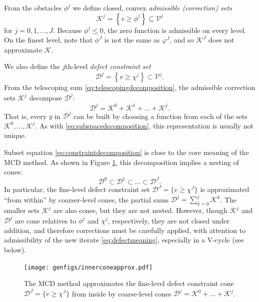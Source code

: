\documentclass[letterpaper,final,12pt,reqno]{amsart}
\theoremstyle{claim}
\numberwithin{equation}{section}
\numberwithin{figure}{section}
\numberwithin{table}{section}
\numberwithin{theorem}{section}
\begin{document}
From the obstacles $\phi^j$ we define closed, convex \emph{admissible (correction) sets}
\begin{equation}
\mathcal{K}^j = \left\{v \ge \phi^j\right\} \subseteq \mathcal{V}^j \label{eq:defineKj}
\end{equation}
for $j=0,1,\dots,J$.  Because $\phi^j \le 0$, the zero function is admissible on every level.  On the finest level, note that $\phi^J$ is not the same as $\varphi^J$, and so $\mathcal{K}^J$ does not approximate $\mathcal{K}$.

We also define the $j$th-level \emph{defect constraint set}
\begin{equation}
  \mathcal{D}^j = \left\{v \ge \chi^j\right\} \subset \mathcal{V}^j.  \label{eq:constraintset}
\end{equation}
From the telescoping sum \eqref{eq:telescopingdecomposition}, the admissible correction sets $\mathcal{K}^j$ decompose $\mathcal{D}^j$:
\begin{equation}
  \mathcal{D}^j = \mathcal{K}^0 + \mathcal{K}^1 + \dots + \mathcal{K}^j. \label{eq:constraintdecomposition}
\end{equation}
That is, every $y$ in $\mathcal{D}^j$ can be built by choosing a function from each of the sets $\mathcal{K}^0,\dots,\mathcal{K}^j$.  As with \eqref{eq:subspacedecomposition}, this representation is usually not unique.

Subset equation \eqref{eq:constraintdecomposition} is close to the core meaning of the MCD method.  As shown in Figure \ref{fig:innerconeapprox}, this decomposition implies a nesting of cones:
\begin{equation}
  \mathcal{D}^0 \subset \mathcal{D}^1 \subset \dots \subset \mathcal{D}^J.  \label{eq:nestedcones}
\end{equation}
In particular, the fine-level defect constraint set $\mathcal{D}^J = \{v \ge \chi^J\}$ is approximated ``from within'' by coarser-level cones, the partial sums $\mathcal{D}^j = \sum_{k=0}^j \mathcal{K}^k$.  The smaller sets $\mathcal{K}^j$ are also cones, but they are not nested.  However, though $\mathcal{K}^j$ and $\mathcal{D}^j$ are cone relatives to $\phi^j$ and $\chi^j$, respectively, they are not closed under addition, and therefore corrections must be carefully applied, with attention to admissibility of the new iterate \eqref{eq:defectmeaning}, especially in a V-cycle (see below).

\begin{figure}
\texttt{[image: genfigs/innerconeapprox.pdf]}

\caption{The MCD method approximates the fine-level defect constraint cone $\mathcal{D}^J = \{v\ge \chi^J\}$ from inside by coarse-level cones $\mathcal{D}^j=\mathcal{K}^0+\dots+\mathcal{K}^j$.}
\label{fig:innerconeapprox}
\end{figure}
\end{document}
